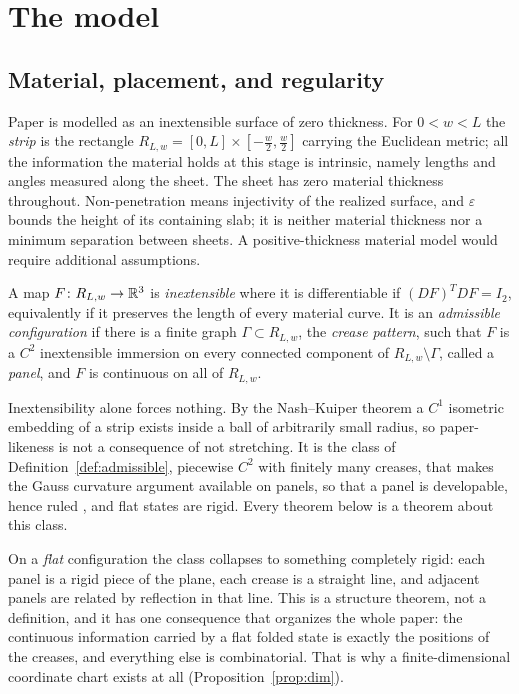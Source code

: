 \section{The model}\label{sec:model}

\subsection{Material, placement, and regularity}

Paper is modelled as an inextensible surface of zero thickness. For $0<w<L$ the \emph{strip} is the rectangle $R_{L,w}=[0,L]\times[-\tfrac w2,\tfrac w2]$ carrying the Euclidean metric; all the information the material holds at this stage is intrinsic, namely lengths and angles measured along the sheet. The sheet has zero material thickness throughout. Non-penetration means injectivity of the realized surface, and $\varepsilon$ bounds the height of its containing slab; it is neither material thickness nor a minimum separation between sheets. A positive-thickness material model would require additional assumptions.

\begin{definition}\label{def:admissible}
A map $F\colon R_{L,w}\to\mathbb{R}^3$ is \emph{inextensible} where it is differentiable if $(DF)^{T}DF=I_2$, equivalently if it preserves the length of every material curve. It is an \emph{admissible configuration} if there is a finite graph $\Gamma\subset R_{L,w}$, the \emph{crease pattern}, such that $F$ is a $C^2$ inextensible immersion on every connected component of $R_{L,w}\setminus\Gamma$, called a \emph{panel}, and $F$ is continuous on all of $R_{L,w}$.
\end{definition}

\begin{remark}\label{rem:regularity}
Inextensibility alone forces nothing. By the Nash--Kuiper theorem \cite{nash1954,kuiper1955} a $C^1$ isometric embedding of a strip exists inside a ball of arbitrarily small radius, so paper-likeness is not a consequence of not stretching. It is the class of Definition~\ref{def:admissible}, piecewise $C^2$ with finitely many creases, that makes the Gauss curvature argument available on panels, so that a panel is developable, hence ruled \cite{docarmo1976}, and flat states are rigid. Every theorem below is a theorem about this class.
\end{remark}

On a \emph{flat} configuration the class collapses to something completely rigid: each panel is a rigid piece of the plane, each crease is a straight line, and adjacent panels are related by reflection in that line. This is a structure theorem, not a definition, and it has one consequence that organizes the whole paper: the continuous information carried by a flat folded state is exactly the positions of the creases, and everything else is combinatorial. That is why a finite-dimensional coordinate chart exists at all (Proposition~\ref{prop:dim}).


